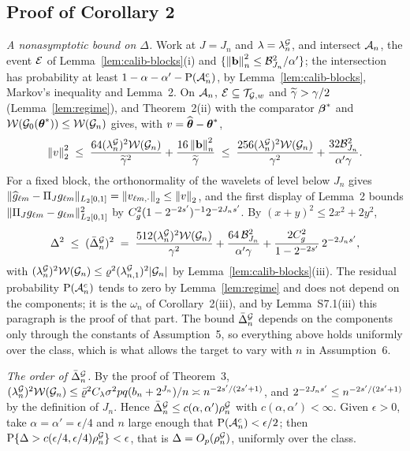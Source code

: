 \subsection*{Proof of Corollary 2}

\emph{A nonasymptotic bound on $\Delta$.} Work at $J = J_n$ and
$\lambda = \lambda^{\mathcal{G}}_{n}$, and intersect $\mathcal{A}_{n}$, the event $\mathcal{E}$ of
Lemma~\ref{lem:calib-blocks}(i) and
$\{\left\lVert \mathbf{b} \right\rVert_{n}^{2} \le \mathcal{B}_{J_n}^{2}/\alpha'\}$; the intersection has
probability at least $1 - \alpha - \alpha' - \mathrm{P}(\mathcal{A}_{n}^{c})$, by
Lemma~\ref{lem:calib-blocks}, Markov's inequality and Lemma~2. On $\mathcal{A}_{n}$,
$\mathcal{E} \subseteq \mathcal{T}_{\mathcal{G},w}$ and $\widetilde{\gamma} > \gamma/2$ (Lemma~\ref{lem:regime}), and
Theorem~2(ii) with the comparator $\boldsymbol{\beta}^{*}$ and
$\mathcal{W}(\mathcal{G}_{0}(\boldsymbol{\theta}^{*})) \le \mathcal{W}(\mathcal{G}_{n})$ gives, with
$v = \widehat{\boldsymbol{\theta}} - \boldsymbol{\theta}^{*}$,
\[
  \left\lVert v \right\rVert_{2}^{2} \;\le\; \frac{64(\lambda^{\mathcal{G}}_{n})^{2}\mathcal{W}(\mathcal{G}_{n})}{\widetilde{\gamma}^{2}}
  + \frac{16\left\lVert \mathbf{b} \right\rVert_{n}^{2}}{\widetilde{\gamma}}
  \;\le\; \frac{256(\lambda^{\mathcal{G}}_{n})^{2}\mathcal{W}(\mathcal{G}_{n})}{\gamma^{2}}
  + \frac{32\mathcal{B}^{2}_{J_n}}{\alpha'\gamma} .
\]
For a fixed block, the orthonormality of the wavelets of level below $J_n$
gives $\lVert\widehat{g}_{\ell m} - \Pi_{J}g_{\ell m}\rVert_{L_2[0,1]} =
\left\lVert v_{\ell m,\cdot} \right\rVert_2 \le \left\lVert v \right\rVert_2$, and the first display of Lemma~2
bounds $\lVert\Pi_{J}g_{\ell m} - g_{\ell m}\rVert^2_{L_2[0,1]}$ by
$C_g^2(1-2^{-2s'})^{-1}2^{-2J_ns'}$. By $(x+y)^2 \le 2x^2 + 2y^2$,
\begin{equation}
  \label{eq:Dn-blocks}
  \Delta^{2} \;\le\; (\bar{\Delta}^{\mathcal{G}}_n)^{2} \;=\;
  \frac{512(\lambda^{\mathcal{G}}_{n})^{2}\mathcal{W}(\mathcal{G}_{n})}{\gamma^{2}}
  + \frac{64\,\mathcal{B}^2_{J_n}}{\alpha'\gamma}
  + \frac{2C_g^2}{1-2^{-2s'}}\,2^{-2J_ns'},
\end{equation}
with $(\lambda^{\mathcal{G}}_{n})^{2}\mathcal{W}(\mathcal{G}_{n}) \le \varrho^{2}(\lambda^{\mathcal{G}}_{n,1})^{2}|\mathcal{G}_{n}|$ by
Lemma~\ref{lem:calib-blocks}(iii). The residual probability
$\mathrm{P}(\mathcal{A}_{n}^{c})$ tends to zero by Lemma~\ref{lem:regime} and does not depend
on the components; it is the $\omega_n$ of Corollary~2(iii), and by
Lemma~S7.1(iii) this paragraph is the proof of that part. The bound
$\bar{\Delta}^{\mathcal{G}}_n$ depends on the components only through the constants
of Assumption~5, so everything above holds uniformly over the class, which is
what allows the target to vary with $n$ in Assumption~6.

\emph{The order of $\bar{\Delta}^{\mathcal{G}}_n$.} By the proof of Theorem~3,
$(\lambda^{\mathcal{G}}_{n})^{2}\mathcal{W}(\mathcal{G}_{n}) \le \bar\varrho^{2}C_{\lambda}\sigma^{2}pq(b_{n} +
2^{J_n})/n \asymp n^{-2s'/(2s'+1)}$, and $2^{-2J_ns'} \le
n^{-2s'/(2s'+1)}$ by the definition of $J_n$. Hence
$\bar{\Delta}^{\mathcal{G}}_n \le c(\alpha,\alpha')\rho^{\mathcal{G}}_{n}$ with
$c(\alpha,\alpha') < \infty$. Given $\epsilon > 0$, take
$\alpha = \alpha' = \epsilon/4$ and $n$ large enough that
$\mathrm{P}(\mathcal{A}_{n}^{c}) < \epsilon/2$; then
$\mathrm{P}\{\Delta > c(\epsilon/4,\epsilon/4)\rho^{\mathcal{G}}_{n}\} < \epsilon$, that is
$\Delta = O_p(\rho^{\mathcal{G}}_{n})$, uniformly over the class.

